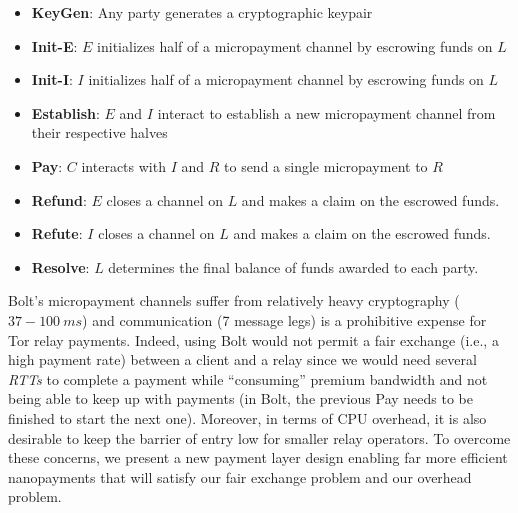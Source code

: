 \begin{itemize}
\item \textbf{KeyGen}: Any party generates a cryptographic keypair
\item \textbf{Init-E}: $E$ initializes half of a micropayment channel by
  escrowing funds on $L$
\item \textbf{Init-I}: $I$ initializes half of a micropayment channel by
  escrowing funds on $L$
\item \textbf{Establish}: $E$ and $I$ interact to establish a new micropayment
  channel from their respective halves
\item \textbf{Pay}: $C$ interacts with $I$ and $R$ to send a single micropayment to $R$
\item \textbf{Refund}: $E$ closes a channel on $L$ and makes a claim on
  the escrowed funds.
\item \textbf{Refute}: $I$ closes a channel on $L$ and makes a claim on
  the escrowed funds.
\item \textbf{Resolve}: $L$ determines the final balance of funds awarded to
  each party.
\end{itemize}

Bolt's micropayment channels suffer from relatively heavy cryptography ($37-100\ ms$) and communication
(7 message legs) is a prohibitive expense for Tor relay payments. Indeed, using Bolt would not permit a fair exchange (i.e., a high payment rate) between a client and a relay since we would need several \textit{RTTs} to complete a payment while ``consuming'' premium bandwidth and not being able to keep up with payments (in Bolt, the previous Pay needs to be finished to start the next one). Moreover, in terms of CPU overhead, it is also desirable to keep the
barrier of entry low for smaller relay operators. To overcome these
concerns, we present a new payment layer design enabling far more efficient
nanopayments that will satisfy our fair exchange problem and our overhead problem.

